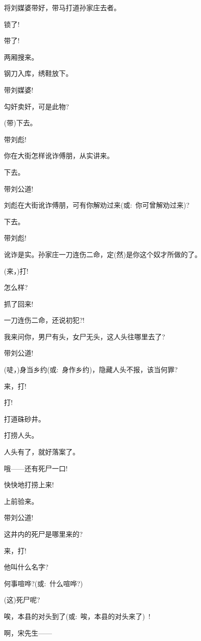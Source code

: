 {{将刘媒婆带好，带马打道孙家庄去者。}

{\vspace{5pt}}

{锁了!}

{带了!}

{两厢搜来。}

{钢刀入库，绣鞋放下。}

{带刘媒婆!}

{勾奸卖奸，可是此物?}

{(带)下去。}

{带刘彪!}

{你在大街怎样讹诈傅朋，从实讲来。}

{下去。}

{带刘公道!}

{刘彪在大街讹诈傅朋，可有你解劝过来({\akai 或}:~你可曾解劝过来)?}

{下去。}

{带刘彪!}

{讹诈是实。孙家庄一刀连伤二命，定(然)是你这个奴才所做的了。}

{(来，)打!}

{怎么样?}

{抓了回来!}

{一刀连伤二命，还说初犯?!}

{我来问你，男尸有头，女尸无头，这人头往哪里去了?}

{带刘公道!}

{(唗，)身当乡约({\akai 或}:~身作乡约)，隐藏人头不报，该当何罪?}

{来，打!}

{打!}

{打道硃砂井。}

{打捞人头。}

{人头有了，就好落案了。}

{哦------还有死尸一口!}

{快快地打捞上来!}

{上前验来。}

{带刘公道!}

{这井内的死尸是哪里来的?}

{来，打!}

{他叫什么名字?}

{何事喧哗?({\akai 或}:~什么喧哗?)}

{(这)死尸呢?}

{唉，本县的对头到了({\akai 或}:~唉，本县的对头来了)~!}

{啊，宋先生------}

}
